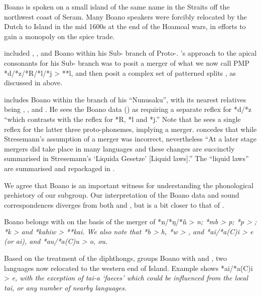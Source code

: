 Boano is spoken on a small island of the same name in the 
Straits off the northwest coast of Seram.
Many Boano speakers were forcibly relocated by the Dutch to 
Island in the mid 1600s at the end of the Hoamoal wars,
in efforts to gain a monopoly on the spice trade.

\citet{Stresemann1927} included , ,
and Boano within his Sub- branch of Proto-.
\citeauthor{Stresemann1927}’s approach to the apical consonants for his Sub-
branch was to posit a merger of what we now call PMP *d/*z/*R/*l/*j
> **l, and then posit a complex set of patterned splits \citep[23--29]{Stresemann1927},
as discussed in  above.

\citet{Collins1983} includes Boano within the 
branch of his “Nunusaku”,
with its nearest relatives being , , and .
He sees the Boano data (\citeyear[88--93]{Collins1983})
as requiring a separate reflex
for *d/*z “which contrasts with the reflex for *R,
*l and *j.” Note that he sees a single reflex for the latter
three proto-phonemes, implying a merger.
\citet[88]{Collins1983} concedes that while Stresemann’s assumption
of a merger was incorrect,
nevertheless “At a later stage mergers did take place in many
languages and these changes are succinctly summarised
in Stresemann’s ‘Liquida Gesetze’ [Liquid laws].”
The “liquid laws” are summarised
and repackaged in .

We agree that Boano is an important witness for understanding
the phonological prehistory of our  subgroup.
Our interpretation of the Boano data
and sound correspondences diverges from both \citeauthor{Stresemann1927}
and \citeauthor{Collins1983}, but is a bit closer to that of \citeauthor{Collins1983}.

Boano belongs with  on the basis of the merger
of *n/*ŋ/*ñ > \it{n}; *mb > \it{p}; *p > {\0}; *k > {\0}
and  *kahiw > **kai.
We also note that *b > \it{h},
*w > {\0}, and *ai/*a(C)i > \it{e} (or \it{ai}),
and *au/*a(C)u > \it{o}, \it{ou}.

Based on the treatment of the diphthongs,
\citet[69--73]{Collins1983} groups Boano with 
and , two languages now relocated to the western end of  Island.
Example  shows *ai/*a(C)i > \it{e},
with the exception of \it{tai-a} ‘faeces’ which could be influenced
from the local  \it{tai},
or any number of nearby languages.
\\

